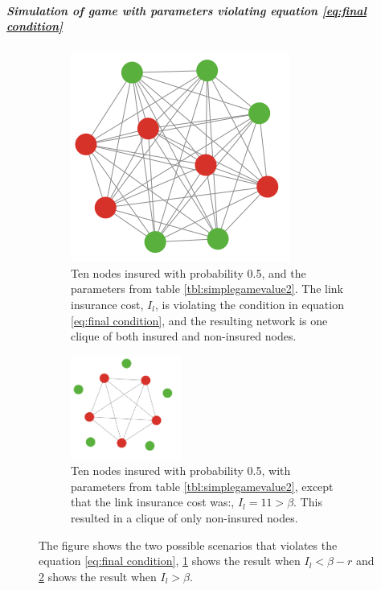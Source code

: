 \subparagraph{Simulation of game with parameters violating equation \ref{eq:final condition}}
\begin{figure}[h]
\centering
\begin{subfigure}{.5\textwidth}
  \centering
\includegraphics[width=0.4\linewidth]{../Figures/FirstSimulationViolatingResult.png}

\caption{\label{fig:SimulationViolatingA} Ten nodes insured with probability 0.5, and the parameters from table \ref{tbl:simplegamevalue2}. The link insurance cost, $I_{l}$, is violating the condition in equation \ref{eq:final condition}, and the resulting network is one clique of both insured and non-insured nodes.}
\end{subfigure}
\quad
\begin{subfigure}{0.46\textwidth}
\centering
\includegraphics[width=0.4\textwidth]{../Figures/SimulationViolating2.png}

\caption{\label{fig:SimulationViolatingB} Ten nodes insured with probability 0.5, with parameters from table \ref{tbl:simplegamevalue2}, except that the link insurance cost was:, $I_{l}=11>\beta$. This resulted in a clique of only non-insured nodes. }
\end{subfigure}
\caption{\label{fig:SimulationViolating} The figure shows the two possible scenarios that violates the equation \ref{eq:final condition}, \ref{fig:SimulationViolatingA} shows the result when $I_{l}<\beta-r$ and \ref{fig:SimulationViolatingB} shows the result when $I_{l}>\beta$.}
\end{figure}

